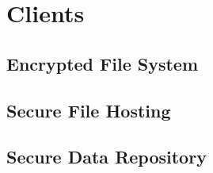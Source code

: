 \chapter{Clients}
\label{chap:clients}

\section{Encrypted File System}

\section{Secure File Hosting}

\section{Secure Data Repository}

